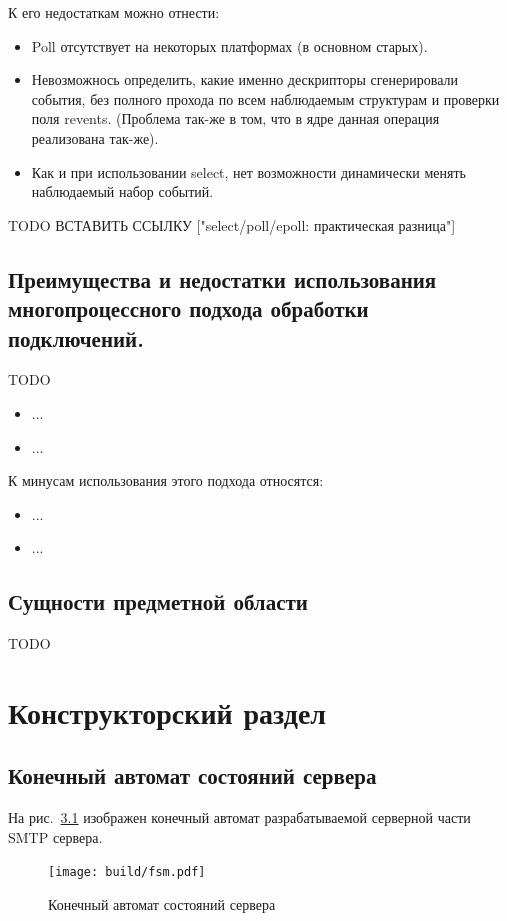 \documentclass[a4paper,12pt]{report}
\begin{document}
К его недостаткам можно отнести:
\begin{itemize}
 	\item Poll отсутствует на некоторых платформах (в основном старых). 
	\item Невозможнось определить, какие именно дескрипторы сгенерировали события, без полного прохода по всем наблюдаемым структурам и проверки поля revents. (Проблема так-же в том, что в ядре данная операция реализована так-же). 
	\item Как и при использовании select, нет возможности динамически менять наблюдаемый набор событий. 
\end{itemize}

TODO ВСТАВИТЬ ССЫЛКУ ["select/poll/epoll: практическая разница"]

\section{Преимущества и недостатки использования многопроцессного подхода обработки подключений.}
TODO

\begin{itemize}
 	\item ...
	\item ...
\end{itemize}

К минусам использования этого подхода относятся:
\begin{itemize}
    \item ...
    \item ...
\end{itemize}


\section{Сущности предметной области}

TODO

\newpage
\chapter{Конструкторский раздел}

\section{Конечный автомат состояний сервера}

На рис.~\ref{fig:fsm} изображен конечный автомат разрабатываемой серверной части SMTP сервера. 

\begin{figure}[H]
	\centering
	\texttt{[image: build/fsm.pdf]}
	\caption{Конечный автомат состояний сервера}
	\label{fig:fsm}
\end{figure}
\end{document}
